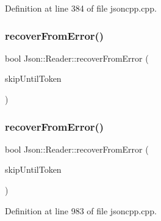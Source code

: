 Definition at line 384 of file jsoncpp.\+cpp.

\hypertarget{class_json_1_1_reader_a8d4ed03a43082c5ace81ba5b81425eaf}{}\label{class_json_1_1_reader_a8d4ed03a43082c5ace81ba5b81425eaf} 
\subsubsection{\texorpdfstring{recover\+From\+Error()}{recoverFromError()}\hspace{0.1cm}{\footnotesize\ttfamily [1/2]}}
{\footnotesize\ttfamily bool Json\+::\+Reader\+::recover\+From\+Error (\begin{DoxyParamCaption}\item[{\hyperlink{class_json_1_1_reader_aa35e6ab574dc399a0a645ad98ed66bc9}{Token\+Type}}]{skip\+Until\+Token }\end{DoxyParamCaption})\hspace{0.3cm}{\ttfamily [private]}}

\hypertarget{class_json_1_1_reader_a8d4ed03a43082c5ace81ba5b81425eaf}{}\label{class_json_1_1_reader_a8d4ed03a43082c5ace81ba5b81425eaf} 
\subsubsection{\texorpdfstring{recover\+From\+Error()}{recoverFromError()}\hspace{0.1cm}{\footnotesize\ttfamily [2/2]}}
{\footnotesize\ttfamily bool Json\+::\+Reader\+::recover\+From\+Error (\begin{DoxyParamCaption}\item[{\hyperlink{class_json_1_1_reader_aa35e6ab574dc399a0a645ad98ed66bc9}{Token\+Type}}]{skip\+Until\+Token }\end{DoxyParamCaption})\hspace{0.3cm}{\ttfamily [private]}}



Definition at line 983 of file jsoncpp.\+cpp.

\hypertarget{class_json_1_1_reader_a22e677ef400d8223f27e631b4cd4b821}{}\label{class_json_1_1_reader_a22e677ef400d8223f27e631b4cd4b821} 
